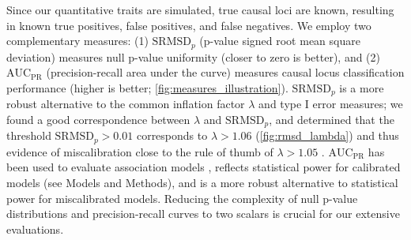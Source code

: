 \documentclass[11pt]{article}
\newcommand{\rmsd}{\text{SRMSD}_p}
\newcommand{\auc}{\text{AUC}_\text{PR}}
\begin{document}
Since our quantitative traits are simulated, true causal loci are known, resulting in known true positives, false positives, and false negatives.
We employ two complementary measures:
(1) $\rmsd$ (p-value signed root mean square deviation) measures null p-value uniformity (closer to zero is better), and
(2) $\auc$ (precision-recall area under the curve) measures causal locus classification performance (higher is better; \cref{fig:measures_illustration}).
$\rmsd$ is a more robust alternative to the common inflation factor $\lambda$ and type I error measures; we found a good correspondence between $\lambda$ and $\rmsd$, and determined that the threshold $\rmsd > 0.01$ corresponds to $\lambda > 1.06$ (\cref{fig:rmsd_lambda}) and thus evidence of miscalibration close to the rule of thumb of $\lambda > 1.05$ \citep{price_new_2010}.
$\auc$ has been used to evaluate association models \citep{rakitsch_lasso_2013}, reflects statistical power for calibrated models (see Models and Methods), and is a more robust alternative to statistical power for miscalibrated models.
Reducing the complexity of null p-value distributions and precision-recall curves to two scalars is crucial for our extensive evaluations.
\end{document}
